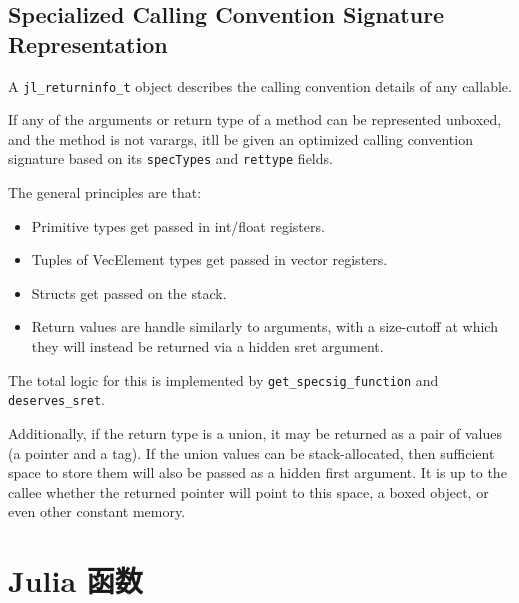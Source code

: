 \hypertarget{5801902447580234191}{}


\subsection{Specialized Calling Convention Signature Representation}



A \texttt{jl\_returninfo\_t} object describes the calling convention details of any callable.



If any of the arguments or return type of a method can be represented unboxed, and the method is not varargs, it{\textquotesingle}ll be given an optimized calling convention signature based on its \texttt{specTypes} and \texttt{rettype} fields.



The general principles are that:



\begin{itemize}
\item Primitive types get passed in int/float registers.


\item Tuples of VecElement types get passed in vector registers.


\item Structs get passed on the stack.


\item Return values are handle similarly to arguments, with a size-cutoff at which they will instead be returned via a hidden sret argument.

\end{itemize}


The total logic for this is implemented by \texttt{get\_specsig\_function} and \texttt{deserves\_sret}.



Additionally, if the return type is a union, it may be returned as a pair of values (a pointer and a tag). If the union values can be stack-allocated, then sufficient space to store them will also be passed as a hidden first argument. It is up to the callee whether the returned pointer will point to this space, a boxed object, or even other constant memory.



\hypertarget{3539827185509825766}{}


\section{Julia 函数}



